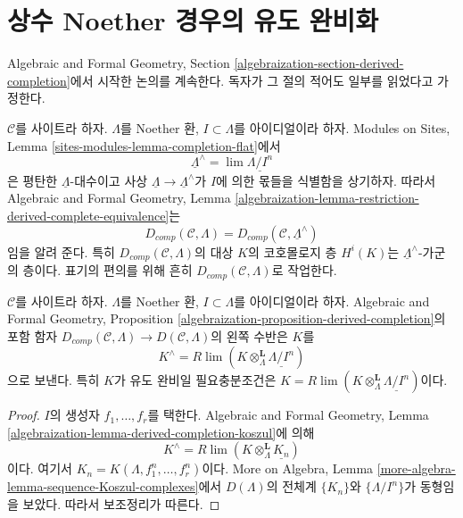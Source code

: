 \section{상수 Noether 경우의 유도 완비화}
\label{section-derived-completion-noetherian}

\noindent
Algebraic and Formal Geometry, Section
\ref{algebraization-section-derived-completion}에서 시작한 논의를
계속한다. 독자가 그 절의 적어도 일부를 읽었다고 가정한다.

\medskip\noindent
$\mathcal{C}$를 사이트라 하자. $\Lambda$를 Noether 환,
$I \subset \Lambda$를 아이디얼이라 하자. Modules on Sites, Lemma
\ref{sites-modules-lemma-completion-flat}에서
$$
\underline{\Lambda}^\wedge = \lim \underline{\Lambda/I^n}
$$
은 평탄한 $\underline{\Lambda}$-대수이고 사상
$\underline{\Lambda} \to \underline{\Lambda}^\wedge$가 $I$에 의한
몫들을 식별함을 상기하자. 따라서 Algebraic and Formal Geometry,
Lemma
\ref{algebraization-lemma-restriction-derived-complete-equivalence}는
$$
D_{comp}(\mathcal{C}, \Lambda) =
D_{comp}(\mathcal{C}, \underline{\Lambda}^\wedge)
$$
임을 알려 준다. 특히 $D_{comp}(\mathcal{C}, \Lambda)$의 대상 $K$의
코호몰로지 층 $H^i(K)$는 $\underline{\Lambda}^\wedge$-가군의 층이다.
표기의 편의를 위해 흔히 $D_{comp}(\mathcal{C}, \Lambda)$로 작업한다.

\begin{lemma}
\label{lemma-naive-completion}
$\mathcal{C}$를 사이트라 하자. $\Lambda$를 Noether 환,
$I \subset \Lambda$를 아이디얼이라 하자. Algebraic and Formal
Geometry, Proposition
\ref{algebraization-proposition-derived-completion}의 포함 함자
$D_{comp}(\mathcal{C}, \Lambda) \to D(\mathcal{C}, \Lambda)$의 왼쪽
수반은 $K$를
$$
K^\wedge = R\lim(K \otimes_\Lambda^\mathbf{L} \underline{\Lambda/I^n})
$$
으로 보낸다. 특히 $K$가 유도 완비일 필요충분조건은
$K = R\lim(K \otimes_\Lambda^\mathbf{L} \underline{\Lambda/I^n})$이다.
\end{lemma}

\begin{proof}
$I$의 생성자 $f_1, \ldots, f_r$를 택한다. Algebraic and Formal
Geometry, Lemma \ref{algebraization-lemma-derived-completion-koszul}에
의해
$$
K^\wedge = 
R\lim (K \otimes_\Lambda^\mathbf{L} \underline{K_n})
$$
이다. 여기서 $K_n = K(\Lambda, f_1^n, \ldots, f_r^n)$이다.
More on Algebra, Lemma
\ref{more-algebra-lemma-sequence-Koszul-complexes}에서
$D(\Lambda)$의 전체계 $\{K_n\}$와 $\{\Lambda/I^n\}$가 동형임을
보았다. 따라서 보조정리가 따른다.
\end{proof}

